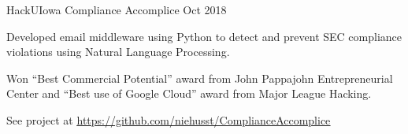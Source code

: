 \documentclass[12pt, a4paper]{awesome-cv}
\begin{document}
\begin{cventries}

    \cventry
	{HackUIowa}
 	{Compliance Accomplice}
	{Oct 2018}
	{}
	{
	  \begin{cvitems}
	     \item{Developed email middleware using Python to detect and prevent SEC compliance violations using Natural Language Processing.}
	     \item{Won “Best Commercial Potential” award from John Pappajohn Entrepreneurial Center and “Best use of Google Cloud” award from Major League Hacking.}
	     \item{See project at \underline{\href{https://github.com/niehusst/ComplianceAccomplice}{https://github.com/niehusst/ComplianceAccomplice}}} 
	  \end{cvitems}
	}



\end{cventries}


%
%
\end{document}
